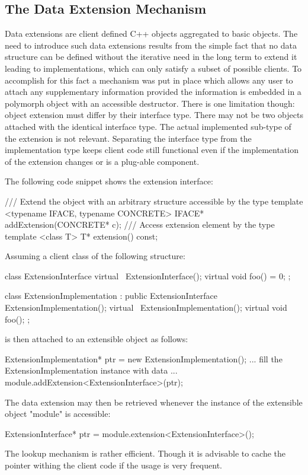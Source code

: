 \documentclass[10pt,a4paper]{article}
\begin{document}
\newpage
\subsection{The Data Extension Mechanism}
\label{sec:dd4hep-user-manual-data-extensions}
\noindent
Data extensions are client defined C++ objects aggregated to basic \DDhep objects.
The need to introduce such data extensions results from the simple fact that
no data structure can be defined without the iterative need in the long term
to extend it leading to implementations, which can only satisfy a subset of 
possible clients. To accomplish for this fact a mechanism was put in place
which allows any user to attach any supplementary information provided
the information is embedded in a polymorph object with an accessible destructor.
There is one limitation though: object extension must differ by their 
interface type. 
There may not be two objects attached with the identical interface type.
The actual implemented sub-type of the extension is not relevant.
Separating the interface type from the implementation type keeps client
code still functional even if the implementation of the extension changes 
or is a plug-able component.

\noindent
The following code snippet shows the extension interface:

\begin{code}
  /// Extend the object with an arbitrary structure accessible by the type
  template <typename IFACE, typename CONCRETE> IFACE* addExtension(CONCRETE* c);
  /// Access extension element by the type
  template <class T> T* extension() const;
\end{code}

Assuming a client class of the following structure:
\begin{code}
    class ExtensionInterface {
      virtual ~ExtensionInterface();
      virtual void foo() = 0;
    };

    class ExtensionImplementation : public ExtensionInterface {
      ExtensionImplementation();
      virtual ~ExtensionImplementation();
      virtual void foo();
    };
\end{code}
is then attached to an extensible object as follows:
\begin{code}
    ExtensionImplementation* ptr = new ExtensionImplementation();
    ... fill the ExtensionImplementation instance with data ...
    module.addExtension<ExtensionInterface>(ptr);
\end{code}
The data extension may then be retrieved whenever the instance of the
extensible object "module" is accessible:
\begin{code}
    ExtensionInterface* ptr = module.extension<ExtensionInterface>();
\end{code}
The lookup mechanism is rather efficient. Though it is advisable to
cache the pointer withing the client code if the usage is very frequent.
\end{document}
